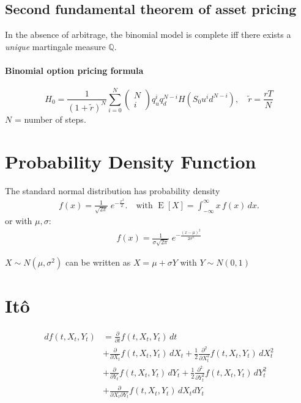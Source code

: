 \documentclass[a4paper, DIV19,12pt]{scrartcl}
\newcommand{\parens}   [1]{         (   #1          )   } %
\newcommand{\bparens}  [1]{\left(       #1 \right)      } %
\begin{document}
\subsection{Second fundamental theorem of asset pricing}
In the absence of arbitrage, the binomial model is complete iff there exists a \emph{unique} martingale measure $\mathbb{Q}$.

\paragraph{Binomial option pricing formula}

\begin{equation}
H_0 = \frac{1}{\bparens{1 + \tilde{r}}^N} \sum_{i = 0}^N \begin{pmatrix}N \\ i \end{pmatrix} q_u^i q_d^{N - i} H\bparens{S_0 u^i d^{N - i}},\quad \tilde{r} = \frac{rT}{N}
\end{equation}
$N$ = number of steps.

\section{Probability Density Function}

The standard normal distribution has probability density
\begin{eqnarray}
    f(x) = \frac{1}{\sqrt{2\pi}}\; e^{-\frac{x^2}{2}}.\quad\text{with } \operatorname{E}[X] = \int_{-\infty}^\infty x\,f(x)\,dx.
\end{eqnarray}
or with $\mu, \sigma$:
\begin{eqnarray}
    f(x) = \frac{1}{\sigma \sqrt{2\pi}}\; e^{-\frac{\parens{x-\mu}^2}{2\sigma^2}}
\end{eqnarray}

$X \sim N \parens{\mu, \sigma^2}$ can be written as $X = \mu + \sigma Y$ with $Y \sim N\parens{0,1}$

\section{It\^{o}}

\begin{align}
df\bparens{t, X_t, Y_t} &= \frac{\partial}{\partial t}f\bparens{t, X_t, Y_t}\,dt  \\
 &+ \frac{\partial}{\partial X_t}f\bparens{t, X_t, Y_t}\,dX_t + \frac{1}{2} \frac{\partial^2}{\partial X^2_t}f\bparens{t, X_t, Y_t}\,dX^2_t \\
 &+ \frac{\partial}{\partial Y_t}f\bparens{t, X_t, Y_t}\,dY_t + \frac{1}{2} \frac{\partial^2}{\partial Y^2_t}f\bparens{t, X_t, Y_t}\,dY^2_t \\
  &+ \frac{\partial}{\partial X_t \partial Y_t}f\bparens{t, X_t, Y_t}\,dX_t dY_t
\end{align}
\end{document}
